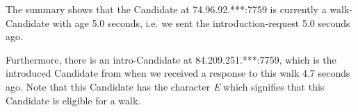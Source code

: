 The summary shows that the Candidate at 74.96.92.***:7759 is currently
a walk-Candidate with age 5.0 seconds, i.e. we sent the
introduction-request 5.0 seconds ago.

Furthermore, there is an intro-Candidate at 84.209.251.***:7759, which
is the introduced Candidate from when we received a response to this
walk 4.7 seconds ago.  Note that this Candidate has the character \emph{E}
which signifies that this Candidate is eligible for a walk.






